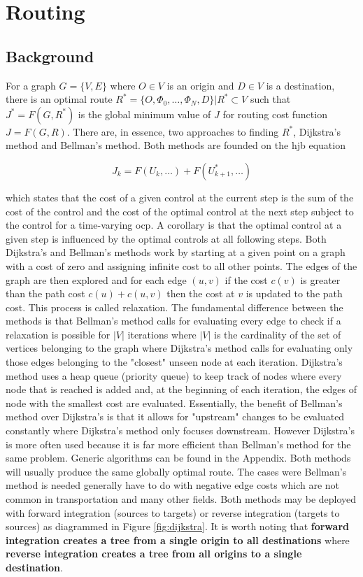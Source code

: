 \section{Routing}

\subsection{Background}

For a graph $G=\{V,E\}$ where $O\in V$ is an origin and $D\in V$ is a destination, there is an optimal route $R^* = \{O, \Phi_0, \dots, \Phi_N, D\}| R^*\subset V$ such that $J^*=F(G,R^*)$ is the global minimum value of $J$ for routing cost function $J = F(G,R)$. There are, in essence, two approaches to finding $R^*$, Dijkstra's method and Bellman's method. Both methods are founded on the \gls{hjb} equation

\begin{equation}
	J_k = F(U_k,\dots) + F(U^*_{k+1},\dots)
\end{equation}

which states that the cost of a given control at the current step is the sum of the cost of the control and the cost of the optimal control at the next step subject to the control for a time-varying \gls{ocp}. A corollary is that the optimal control at a given step is influenced by the optimal controls at all following steps. Both Dijkstra's and Bellman's methods work by starting at a given point on a graph with a cost of zero and assigning infinite cost to all other points. The edges of the graph are then explored and for each edge $(u, v)$ if the cost $c(v)$ is greater than the path cost $c(u) + c(u, v)$ then the cost at $v$ is updated to the path cost. This process is called relaxation. The fundamental difference between the methods is that Bellman's method calls for evaluating every edge to check if a relaxation is possible for $|V|$ iterations where $|V|$ is the cardinality of the set of vertices belonging to the graph where Dijkstra's method calls for evaluating only those edges belonging to the "closest" unseen node at each iteration. Dijkstra's method uses a heap queue (priority queue) to keep track of nodes where every node that is reached is added and, at the beginning of each iteration, the edges of node with the smallest cost are evaluated. Essentially, the benefit of Bellman's method over Dijkstra's is that it allows for "upstream" changes to be evaluated constantly where Dijkstra's method only focuses downstream. However Dijkstra's is more often used because it is far more efficient than Bellman's method for the same problem. Generic algorithms can be found in the Appendix. Both methods will usually produce the same globally optimal route. The cases were Bellman's method is needed generally have to do with negative edge costs which are not common in transportation and many other fields. Both methods may be deployed with forward integration (sources to targets) or reverse integration (targets to sources) as diagrammed in Figure \ref{fig:dijkstra}. It is worth noting that \textbf{forward integration creates a tree from a single origin to all destinations} where \textbf{reverse integration creates a tree from all origins to a single destination}. 

